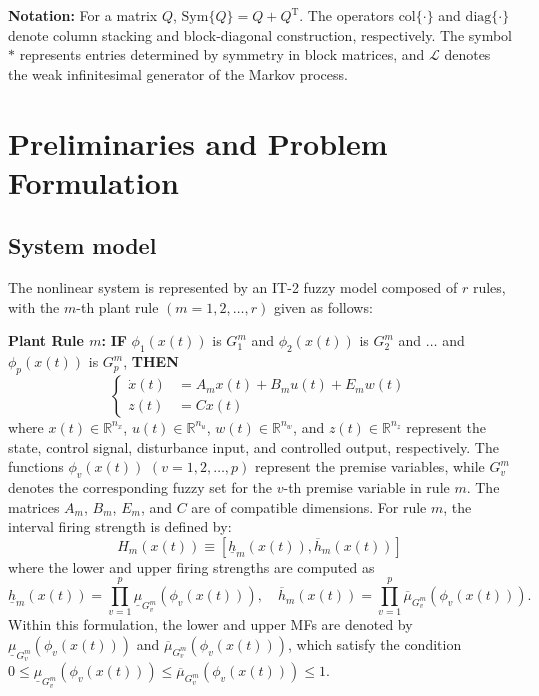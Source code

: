 \documentclass[preprint,review,fleqn,sort&compress,3p]{elsarticle}
\theoremstyle{definition} %
\theoremstyle{definition}%
\begin{document}
\textbf{Notation:} 
For a matrix $Q$, $\mathrm{Sym}\{Q\}=Q+Q^{\mathrm{T}}$.
The operators $\mathrm{col}\{\cdot\}$ and $\mathrm{diag}\{\cdot\}$ denote column stacking and block-diagonal construction, respectively.
The symbol $*$ represents entries determined by symmetry in block matrices, and $\mathcal{L}$ denotes the weak infinitesimal generator of the Markov process.
	

\section{Preliminaries and Problem Formulation}\label{sec2}
\subsection{System model}\label{sec2.1}
The nonlinear system is represented by an IT-2 fuzzy model composed of $r$ rules, with the $m$-th plant rule $(m=1,2,\ldots,r)$ given as follows:

\textbf{Plant Rule $m$:} 
\textbf{IF} $\phi_1(x(t))$ is $G^{m}_1$ and $\phi_2(x(t))$ is $G^{m}_2$ and $\ldots$ and $\phi_p(x(t))$ is $G^{m}_p$, \textbf{THEN}
\begin{equation}\label{eq:state_system}
	\left\{
	\begin{aligned}
		\dot{x}(t) &= A_{m} x(t) + B_{m} u(t) + E_{m} w(t) \\
		z(t) &= C x(t)
	\end{aligned}
	\right.
\end{equation}
where $x(t)\in\mathbb{R}^{n_x}$, $u(t)\in\mathbb{R}^{n_u}$,
$w(t)\in\mathbb{R}^{n_w}$, and $z(t)\in\mathbb{R}^{n_z}$
represent the state, control signal, disturbance input, and controlled output, respectively.
The functions $\phi_v(x(t))$ $(v=1,2,\ldots,p)$ represent the premise variables, while $G_v^m$ denotes the corresponding fuzzy set for the $v$-th premise variable in rule $m$.
The matrices $A_m$, $B_m$, $E_m$, and $C$ are of compatible dimensions.
For rule $m$, the interval firing strength is defined by:
\begin{equation}
	H_m(x(t)) \equiv \left[ \underline{h}_m(x(t)), \overline{h}_m(x(t)) \right]
\end{equation} 
where the lower and upper firing strengths are computed as
\begin{equation}
	\underline{h}_m(x(t)) = \prod_{v=1}^{p} \underline{\mu}_{G^m_{v}}(\phi_v(x(t))),
	\quad
	\overline{h}_m(x(t)) = \prod_{v=1}^{p} \overline{\mu}_{G^m_{v}}(\phi_v(x(t))).
\end{equation}
Within this formulation, the lower and upper MFs are denoted by $\underline{\mu}_{G^m_{v}}(\phi_v(x(t)))$ and $\overline{\mu}_{G^m_{v}}(\phi_v(x(t)))$, which satisfy the condition $0 \le \underline{\mu}_{G^m_{v}}(\phi_v(x(t))) \le \overline{\mu}_{G^m_{v}}(\phi_v(x(t))) \le 1$.
\end{document}
